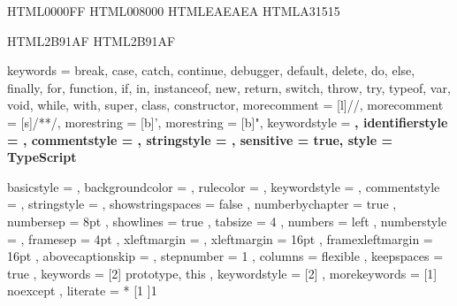 
\usepackage{listings} 
\usepackage{accsupp}


\newcommand{\noncopynumber}[1]{%
    \BeginAccSupp{method=escape,ActualText={}}%
    #1%
    \EndAccSupp{}%
}

\makeatletter
\def\lst@outputspace{{\ifx\lst@bkgcolor\empty\color{white}\else\lst@bkgcolor\fi\lst@visiblespace}}
\makeatother

\definecolor{msvc_keyword}   {HTML}{0000FF} 
\definecolor{msvc_comment}   {HTML}{008000} 
\definecolor{msvc_frame}     {HTML}{EAEAEA}
\definecolor{msvc_string}    {HTML}{A31515}

\definecolor{msvc_operators} {HTML}{2B91AF}
\definecolor{msvc_stl}       {HTML}{2B91AF}

{
    keywords        = {break, case, catch, continue, debugger, default, delete, do, else, finally, for, function, if, in, instanceof, new, return, switch, throw, try, typeof, var, void, while, with, super, class, constructor},
    morecomment     = [l]{//},
    morecomment     = [s]{/*}{*/},
    morestring      = [b]',
    morestring      = [b]", 
    keywordstyle    = \color{blue}\bfseries,
    identifierstyle = \color{black},
    commentstyle    = \color{teal}\ttfamily,
    stringstyle     = \color{red}\ttfamily,
    sensitive       = true,
    style           = TypeScript
}

{
    basicstyle       = 
\ttfamily
\lst@ifdisplaystyle\footnotesize\fi %
,   backgroundcolor  = \color{msvc_background}
,   rulecolor        = \color{msvc_background}
,   keywordstyle     = \lst@ifdisplaystyle\color{msvc_keyword}\fi
,   commentstyle     = \lst@ifdisplaystyle\color{msvc_comment}\fi
,   stringstyle      = \lst@ifdisplaystyle\color{msvc_string}\fi
,   showstringspaces = false
,   numberbychapter  = true
,   numbersep        =  8pt
,   showlines        = true
,   tabsize          =  4          
,   numbers          = left
,   numberstyle      = \tiny\color{msvc_linenumber}\noncopynumber
,   framesep         =  4pt
,   xleftmargin      = \parindent
,   xleftmargin      = 16pt
,   framexleftmargin = 16pt
,   abovecaptionskip = \medskipamount
,   stepnumber       = 1
,   columns          = flexible
,   keepspaces       = true
,	keywords         = [2]{ prototype, this }
,	keywordstyle     = [2]\lst@ifdisplaystyle\color{msvc_stl}\fi
,   morekeywords     = [1]{ noexcept }
,	literate         = *
{[}{{\lst@ifdisplaystyle\color{msvc_operators}\fi{[}}}{1}
{]}{{\lst@ifdisplaystyle\color{msvc_operators}\fi{]}}}{1}
}
